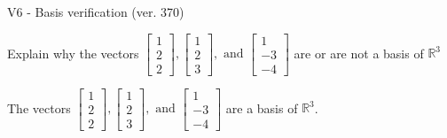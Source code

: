 \begin{exercise}
  \begin{exerciseTitle}V6 - Basis verification (ver. 370)\end{exerciseTitle}
  \begin{exerciseStatement}
    Explain why the vectors \(\left[\begin{array}{r}
1 \\
2 \\
2
\end{array}\right] , \left[\begin{array}{r}
1 \\
2 \\
3
\end{array}\right] , \text{ and } \left[\begin{array}{r}
1 \\
-3 \\
-4
\end{array}\right]\) are or are not a basis of \(\mathbb{R}^3\)	


  \end{exerciseStatement}
  \begin{exerciseAnswer}
   The vectors \(\left[\begin{array}{r}
1 \\
2 \\
2
\end{array}\right] , \left[\begin{array}{r}
1 \\
2 \\
3
\end{array}\right] , \text{ and } \left[\begin{array}{r}
1 \\
-3 \\
-4
\end{array}\right]\) 
  	 are  a basis of \(\mathbb{R}^3\).
  


  \end{exerciseAnswer}
\end{exercise}